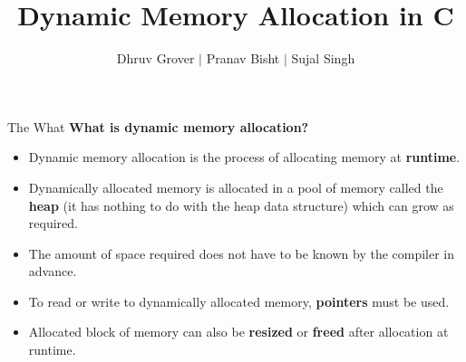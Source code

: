 \documentclass[11pt]{beamer}
\title{Dynamic Memory Allocation in C}
\author{Dhruv Grover \(|\) Pranav Bisht \(|\) Sujal Singh}
\date{}
\begin{document}
    \maketitle

    \begin{frame}{The What}
        \textbf{\large What is dynamic memory allocation?}\\[10pt]
        \begin{itemize}
            \item Dynamic memory allocation is the process of allocating memory at \textbf{runtime}.
            \item Dynamically allocated memory is allocated in a pool of memory called the \textbf{heap} (it has nothing
            to do with the heap data structure) which can grow as required.
            \item The amount of space required does not have to be known by the compiler in advance.
            \item To read or write to dynamically allocated memory, \textbf{pointers} must be used.
            \item Allocated block of memory can also be \textbf{resized} or \textbf{freed} after allocation at runtime.
        \end{itemize}
    \end{frame}
\end{document}
